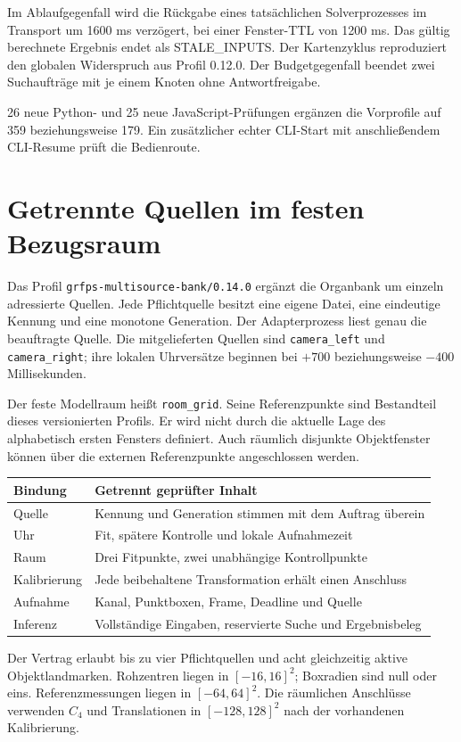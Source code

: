 \documentclass[11pt,a4paper]{article}
\newcommand{\nextsection}[2]{\clearpage{\color{accent}\small\textsf{#1}}\section{#2}}
\begin{document}
Im Ablaufgegenfall wird die Rückgabe eines tatsächlichen
Solverprozesses im Transport um 1600 ms verzögert, bei einer
Fenster-TTL von 1200 ms. Das gültig berechnete Ergebnis endet
als STALE\_INPUTS. Der Kartenzyklus reproduziert den globalen
Widerspruch aus Profil 0.12.0. Der Budgetgegenfall beendet zwei
Suchaufträge mit je einem Knoten ohne Antwortfreigabe.

26 neue Python- und 25 neue JavaScript-Prüfungen ergänzen die
Vorprofile auf 359 beziehungsweise 179. Ein zusätzlicher echter
CLI-Start mit anschließendem CLI-Resume prüft die Bedienroute.

\nextsection{76 / MEHRQUELLENVERTRAG}{Getrennte Quellen im festen Bezugsraum}
Das Profil \texttt{grfps-multisource-bank/0.14.0} ergänzt die
Organbank um einzeln adressierte Quellen. Jede Pflichtquelle besitzt
eine eigene Datei, eine eindeutige Kennung und eine monotone
Generation. Der Adapterprozess liest genau die beauftragte Quelle.
Die mitgelieferten Quellen sind \texttt{camera\_left} und
\texttt{camera\_right}; ihre lokalen Uhrversätze beginnen bei
$+700$ beziehungsweise $-400$ Millisekunden.

Der feste Modellraum heißt \texttt{room\_grid}. Seine Referenzpunkte
sind Bestandteil dieses versionierten Profils. Er wird nicht durch
die aktuelle Lage des alphabetisch ersten Fensters definiert.
Auch räumlich disjunkte Objektfenster können über die externen
Referenzpunkte angeschlossen werden.

\begin{tabularx}{\linewidth}{@{}lY@{}}\toprule
Bindung & Getrennt geprüfter Inhalt\\\midrule
Quelle & Kennung und Generation stimmen mit dem Auftrag überein\\
Uhr & Fit, spätere Kontrolle und lokale Aufnahmezeit\\
Raum & Drei Fitpunkte, zwei unabhängige Kontrollpunkte\\
Kalibrierung & Jede beibehaltene Transformation erhält einen Anschluss\\
Aufnahme & Kanal, Punktboxen, Frame, Deadline und Quelle\\
Inferenz & Vollständige Eingaben, reservierte Suche und Ergebnisbeleg\\\bottomrule
\end{tabularx}

Der Vertrag erlaubt bis zu vier Pflichtquellen und acht gleichzeitig
aktive Objektlandmarken. Rohzentren liegen in $[-16,16]^2$;
Boxradien sind null oder eins. Referenzmessungen liegen in
$[-64,64]^2$. Die räumlichen Anschlüsse verwenden $C_4$ und
Translationen in $[-128,128]^2$ nach der vorhandenen Kalibrierung.
\end{document}
